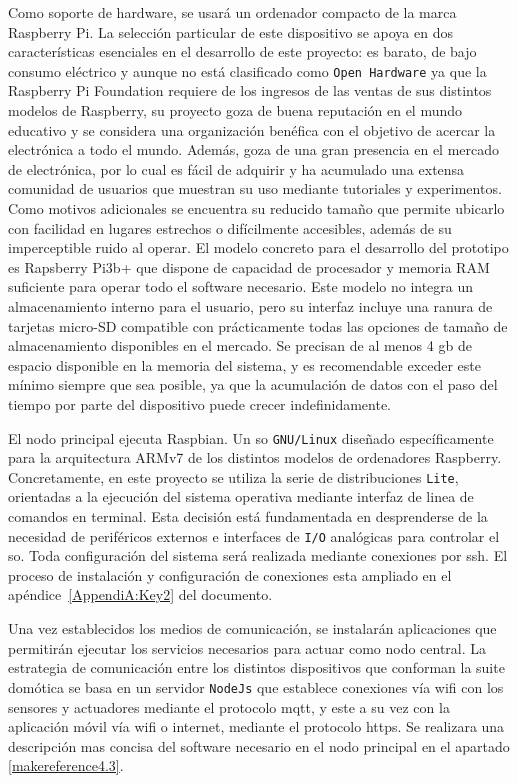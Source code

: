 Como soporte de hardware, se usará un ordenador compacto de la marca Raspberry Pi. La selección particular de este dispositivo se apoya en dos características esenciales en el desarrollo de este proyecto: es barato, de bajo consumo eléctrico y aunque no está clasificado como \verb|Open Hardware| ya que la Raspberry Pi Foundation requiere de los ingresos de las ventas de sus distintos modelos de Raspberry, su proyecto goza de buena reputación en el mundo educativo y se considera una organización benéfica con el objetivo de acercar la electrónica a todo el mundo. Además, goza de una gran presencia en el mercado de electrónica, por lo cual es fácil de adquirir y ha acumulado una extensa comunidad de usuarios que muestran su uso mediante tutoriales y experimentos. Como motivos adicionales se encuentra su reducido tamaño que permite ubicarlo con facilidad en lugares estrechos o difícilmente accesibles, además de su imperceptible ruido al operar. El modelo concreto para el desarrollo del prototipo es Rapsberry Pi3b+ que dispone de capacidad de procesador y memoria RAM suficiente para operar todo el software necesario. Este modelo no integra un almacenamiento interno para el usuario, pero su interfaz incluye una ranura de tarjetas micro-SD compatible con prácticamente todas las opciones de tamaño de almacenamiento disponibles en el mercado. Se precisan de al menos 4 \gls{gb} de espacio disponible en la memoria del sistema, y es recomendable exceder este mínimo siempre que sea posible, ya que la acumulación de datos con el paso del tiempo por parte del dispositivo puede crecer indefinidamente.

\vspace{1cm}

El nodo principal ejecuta Raspbian. Un \gls{so} \verb|GNU/Linux| diseñado específicamente para la arquitectura ARMv7 de los distintos modelos de ordenadores Raspberry. Concretamente, en este proyecto se utiliza la serie de distribuciones \verb|Lite|, orientadas a la ejecución del sistema operativa mediante interfaz de linea de comandos en terminal. Esta decisión está fundamentada en desprenderse de la necesidad de periféricos externos e interfaces de \verb|I/O| analógicas para controlar el \gls{so}. Toda configuración del sistema será realizada mediante conexiones por \gls{ssh}. El proceso de instalación y configuración de conexiones esta ampliado en el apéndice~\ref{AppendiA:Key2} del documento.

\vspace{1cm}

Una vez establecidos los medios de comunicación, se instalarán aplicaciones que permitirán ejecutar los servicios necesarios para actuar como nodo central. La estrategia de comunicación entre los distintos dispositivos que conforman la suite domótica se basa en un servidor \verb|NodeJs| que establece conexiones vía \gls{wifi} con los sensores y actuadores mediante el protocolo \gls{mqtt}, y este a su vez con la aplicación móvil vía \gls{wifi} o internet, mediante el protocolo \gls{https}. Se realizara una descripción mas concisa del software necesario en el nodo principal en el apartado \ref{makereference4.3}.



